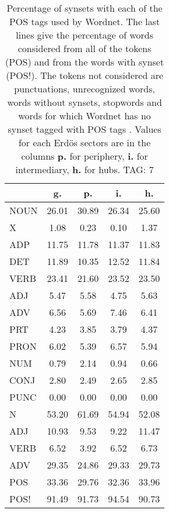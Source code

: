 \begin{table}[h!]
\begin{center}
\begin{tabular}{| l || c | c | c | c |}\hline
 & {\bf g.} & {\bf p.} & {\bf i.} & {\bf h.} \\\hline\hline
NOUN & 26.01  & 30.89  & 26.34  & 25.60 \\
X & 1.08  & 0.23  & 0.10  & 1.37 \\\hline
ADP & 11.75  & 11.78  & 11.37  & 11.83 \\
DET & 11.89  & 10.35  & 12.52  & 11.84 \\\hline
VERB & 23.41  & 21.60  & 23.52  & 23.50 \\\hline
ADJ & 5.47  & 5.58  & 4.75  & 5.63 \\
ADV & 6.56  & 5.69  & 7.46  & 6.41 \\\hline
PRT & 4.23  & 3.85  & 3.79  & 4.37 \\
PRON & 6.02  & 5.39  & 6.57  & 5.94 \\
NUM & 0.79  & 2.14  & 0.94  & 0.66 \\
CONJ & 2.80  & 2.49  & 2.65  & 2.85 \\
PUNC & 0.00  & 0.00  & 0.00  & 0.00 \\\hline\hline\hline
N & 53.20  & 61.69  & 54.94  & 52.08 \\\hline
ADJ & 10.93  & 9.53  & 9.22  & 11.47 \\\hline
VERB & 6.52  & 3.92  & 6.52  & 6.73 \\\hline
ADV & 29.35  & 24.86  & 29.33  & 29.73 \\\hline\hline
POS & 33.36  & 29.76  & 32.36  & 33.96 \\\hline
POS! & 91.49  & 91.73  & 94.54  & 90.73 \\\hline
\end{tabular}
\caption{Percentage of synsets with each of the POS tags used by Wordnet. The last lines give the percentage of words considered from all of the tokens (POS) and from the words with synset (POS!). The tokens not considered are punctuations, unrecognized words, words without synsets, stopwords and words for which Wordnet has no synset  tagged with POS tags . Values for each Erd\"os sectors are in the columns {{\bf p.}} for periphery, {{\bf i.}} for intermediary, {{\bf h.}} for hubs. TAG: 7}
\end{center}
\end{table}